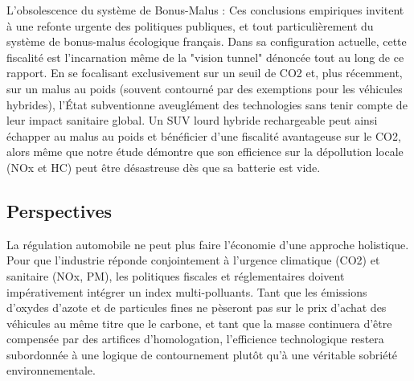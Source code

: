 \vspace{0.6em}

L'obsolescence du système de Bonus-Malus : Ces conclusions empiriques invitent à une refonte urgente des politiques publiques, et tout particulièrement du système de bonus-malus écologique français. Dans sa configuration actuelle, cette fiscalité est l'incarnation même de la "vision tunnel" dénoncée tout au long de ce rapport. En se focalisant exclusivement sur un seuil de CO2 et, plus récemment, sur un malus au poids (souvent contourné par des exemptions pour les véhicules hybrides), l'État subventionne aveuglément des technologies sans tenir compte de leur impact sanitaire global. Un SUV lourd hybride rechargeable peut ainsi échapper au malus au poids et bénéficier d'une fiscalité avantageuse sur le CO2, alors même que notre étude démontre que son efficience sur la dépollution locale (NOx et HC) peut être désastreuse dès que sa batterie est vide.

\subsection{Perspectives}

La régulation automobile ne peut plus faire l'économie d'une approche holistique. Pour que l'industrie réponde conjointement à l'urgence climatique (CO2) et sanitaire (NOx, PM), les politiques fiscales et réglementaires doivent impérativement intégrer un index multi-polluants. Tant que les émissions d'oxydes d'azote et de particules fines ne pèseront pas sur le prix d'achat des véhicules au même titre que le carbone, et tant que la masse continuera d'être compensée par des artifices d'homologation, l'efficience technologique restera subordonnée à une logique de contournement plutôt qu'à une véritable sobriété environnementale.
